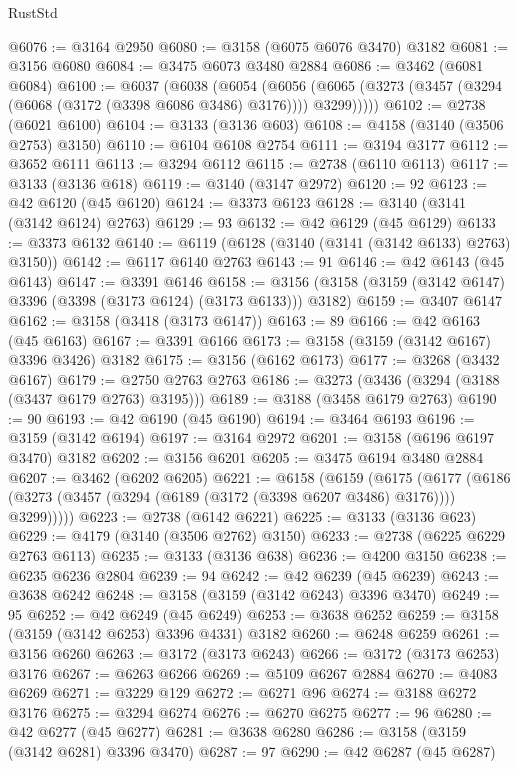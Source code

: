 \begin{lexlean}{RustStd}
\begin{coremodule}
@6076 := @3164 @2950
@6080 := @3158 (@6075 @6076 @3470) @3182
@6081 := @3156 @6080
@6084 := @3475 @6073 @3480 @2884
@6086 := @3462 (@6081 @6084)
@6100 := @6037
    (@6038
      (@6054
        (@6056 (@6065 (@3273 (@3457 (@3294 (@6068 (@3172 (@3398 @6086 @3486) @3176)))) @3299)))))
@6102 := @2738 (@6021 @6100)
@6104 := @3133 (@3136 @603)
@6108 := @4158 (@3140 (@3506 @2753) @3150)
@6110 := @6104 @6108 @2754
@6111 := @3194 @3177
@6112 := @3652 @6111
@6113 := @3294 @6112
@6115 := @2738 (@6110 @6113)
@6117 := @3133 (@3136 @618)
@6119 := @3140 (@3147 @2972)
@6120 := 92
@6123 := @42 @6120 (@45 @6120)
@6124 := @3373 @6123
@6128 := @3140 (@3141 (@3142 @6124) @2763)
@6129 := 93
@6132 := @42 @6129 (@45 @6129)
@6133 := @3373 @6132
@6140 := @6119 (@6128 (@3140 (@3141 (@3142 @6133) @2763) @3150))
@6142 := @6117 @6140 @2763
@6143 := 91
@6146 := @42 @6143 (@45 @6143)
@6147 := @3391 @6146
@6158 := @3156 (@3158 (@3159 (@3142 @6147) @3396 (@3398 (@3173 @6124) (@3173 @6133))) @3182)
@6159 := @3407 @6147
@6162 := @3158 (@3418 (@3173 @6147))
@6163 := 89
@6166 := @42 @6163 (@45 @6163)
@6167 := @3391 @6166
@6173 := @3158 (@3159 (@3142 @6167) @3396 @3426) @3182
@6175 := @3156 (@6162 @6173)
@6177 := @3268 (@3432 @6167)
@6179 := @2750 @2763 @2763
@6186 := @3273 (@3436 (@3294 (@3188 (@3437 @6179 @2763) @3195)))
@6189 := @3188 (@3458 @6179 @2763)
@6190 := 90
@6193 := @42 @6190 (@45 @6190)
@6194 := @3464 @6193
@6196 := @3159 (@3142 @6194)
@6197 := @3164 @2972
@6201 := @3158 (@6196 @6197 @3470) @3182
@6202 := @3156 @6201
@6205 := @3475 @6194 @3480 @2884
@6207 := @3462 (@6202 @6205)
@6221 := @6158
    (@6159
      (@6175
        (@6177 (@6186 (@3273 (@3457 (@3294 (@6189 (@3172 (@3398 @6207 @3486) @3176)))) @3299)))))
@6223 := @2738 (@6142 @6221)
@6225 := @3133 (@3136 @623)
@6229 := @4179 (@3140 (@3506 @2762) @3150)
@6233 := @2738 (@6225 @6229 @2763 @6113)
@6235 := @3133 (@3136 @638)
@6236 := @4200 @3150
@6238 := @6235 @6236 @2804
@6239 := 94
@6242 := @42 @6239 (@45 @6239)
@6243 := @3638 @6242
@6248 := @3158 (@3159 (@3142 @6243) @3396 @3470)
@6249 := 95
@6252 := @42 @6249 (@45 @6249)
@6253 := @3638 @6252
@6259 := @3158 (@3159 (@3142 @6253) @3396 @4331) @3182
@6260 := @6248 @6259
@6261 := @3156 @6260
@6263 := @3172 (@3173 @6243)
@6266 := @3172 (@3173 @6253) @3176
@6267 := @6263 @6266
@6269 := @5109 @6267 @2884
@6270 := @4083 @6269
@6271 := @3229 @129
@6272 := @6271 @96
@6274 := @3188 @6272 @3176
@6275 := @3294 @6274
@6276 := @6270 @6275
@6277 := 96
@6280 := @42 @6277 (@45 @6277)
@6281 := @3638 @6280
@6286 := @3158 (@3159 (@3142 @6281) @3396 @3470)
@6287 := 97
@6290 := @42 @6287 (@45 @6287)

\end{coremodule}
\end{lexlean}

